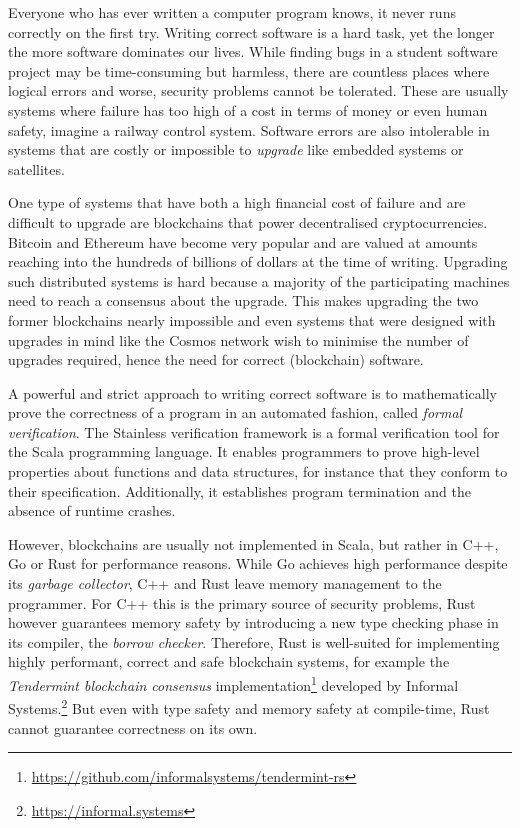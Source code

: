 Everyone who has ever written a computer program knows, it never runs correctly
on the first try. Writing correct software is a hard task, yet the longer the
more software dominates our lives. While finding bugs in a student software
project may be time-consuming but harmless, there are countless places where
logical errors and worse, security problems cannot be tolerated. These are
usually systems where failure has too high of a cost in terms of money or even
human safety, imagine a railway control system. Software errors are also
intolerable in systems that are costly or impossible to \emph{upgrade} like
embedded systems or satellites.

One type of systems that have both a high financial cost of failure and are
difficult to upgrade are blockchains that power decentralised cryptocurrencies.
Bitcoin \cite{bitcoin} and Ethereum \cite{ethereum} have become very popular and
are valued at amounts reaching into the hundreds of billions of dollars at the
time of writing. Upgrading such distributed systems is hard because a majority
of the participating machines need to reach a consensus about the upgrade. This
makes upgrading the two former blockchains nearly impossible and even systems
that were designed with upgrades in mind like the Cosmos network \cite{cosmos}
wish to minimise the number of upgrades required, hence the need for correct
(blockchain) software.

A powerful and strict approach to writing correct software is to mathematically
prove the correctness of a program in an automated fashion, called \emph{formal
verification}. The Stainless verification framework \cite{stainless} is a formal
verification tool for the Scala programming language. It enables programmers to
prove high-level properties about functions and data structures, for instance
that they conform to their specification. Additionally, it establishes program
termination and the absence of runtime crashes.

However, blockchains are usually not implemented in Scala, but rather in C++, Go
or Rust for performance reasons. While Go achieves high performance despite its
\emph{garbage collector}, C++ and Rust leave memory management to the
programmer. For C++ this is the primary source of security problems, Rust
however guarantees memory safety by introducing a new type checking phase in its
compiler, the \emph{borrow checker}. Therefore, Rust is well-suited for
implementing highly performant, correct and safe blockchain systems, for example
the \emph{Tendermint blockchain consensus}
implementation\footnote{\url{https://github.com/informalsystems/tendermint-rs}}
developed by Informal Systems.\footnote{\url{https://informal.systems}} But even
with type safety and memory safety at compile-time, Rust cannot guarantee
correctness on its own.

